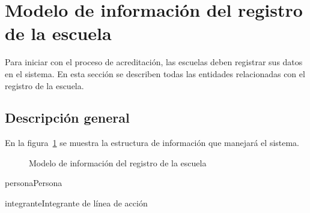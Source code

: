 \section{Modelo de información del registro de la escuela}
Para iniciar con el proceso de acreditación, las escuelas deben registrar sus datos en el sistema. En esta sección se describen todas las entidades relacionadas con el registro de la escuela.

\subsection{Descripción general}
 En la figura~\ref{fig:registroEscuelas} se muestra la estructura de información que manejará el sistema.
 
\begin{figure}[htbp!]
	\begin{center}
		\caption{Modelo de información del registro de la escuela}
		\label{fig:registroEscuelas}
	\end{center}
\end{figure}

\begin{BusinessEntity}{persona}{Persona}
\end{BusinessEntity}
\begin{BusinessEntity}{integrante}{Integrante de línea de acción}
\end{BusinessEntity}
